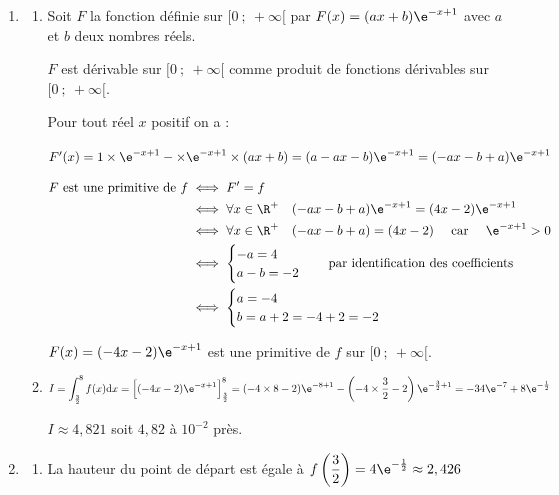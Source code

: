 \begin{enumerate}
\begin{enumerate}
		La fonction $f$ est donc concave sur $\left[0~;~\dfrac{5}{2}\right]$ et convexe sur $\left[\dfrac{5}{2}~;~+\infty\right[$.

		Le point A, d'abscisse  $\dfrac{5}{2}$ est un point d'inflexion de la courbe représentative de $f$.

		\end{enumerate}
	\item

	\begin{enumerate}
		\item  Soit $F$ la fonction définie sur $[0~;~+\infty[$ par $F(x)=(ax+b)\e^{-x+1}$ avec  $a$ et $b$ deux nombres réels.

		$F$  est dérivable sur $[0~;~+\infty[$ comme produit de fonctions dérivables sur $[0~;~+\infty[$.

		Pour tout réel $x$ positif on a :

		$F'(x)= 1 \times \e^{-x+1} - \times \e^{-x+1} \times (ax+b)= (a-ax-b)\e^{-x+1}= (-ax-b+a)\e^{-x+1}$

		$\aligned F\text{ est une primitive de }f &\iff F'=f\\
		&\iff \forall x \in \R^+ \quad  (-ax-b+a)\e^{-x+1}= (4x-2)\e^{-x+1} \\
		&\iff \forall x \in \R^+ \quad (-ax-b+a)= (4x-2) \quad \text{ car } \quad \e^{-x+1}>0 \\
		&\iff \begin{cases} -a=4 \\ a-b=-2 \end{cases} \quad\text{par identification des coefficients}\\
		&\iff \begin{cases} a=- 4 \\ b=a+2=-4+2=-2 \end{cases}\endaligned$

		$F(x)=(-4x-2)\e^{-x+1}$ est une primitive de $f$ sur $[0~;~+\infty[$.

		\item  $\displaystyle  I = \int_{\frac{3}{2}}^8 f(x) \mathrm{d} x = \Big[(-4x-2)\e^{-x+1} \Big]_{\frac{3}{2}}^8
		= (-4\times 8-2)\e^{-8+1} - \left(-4\times \dfrac{3}{2}-2\right)\e^{-\frac{3}{2}+1} = -34\e^{-7}+ 8\e^{-\frac{1}{2}}$

$I \approx 4,821$ soit $4,82$ à $10^{-2}$ près.

	\end{enumerate}

	\item
	\begin{enumerate}
	\item  La hauteur du point de départ est égale à $f\left(\dfrac{3}{2}\right)= 4\e^{-\frac{1}{2}} \approx 2,426$


\end{enumerate}
\end{enumerate}
